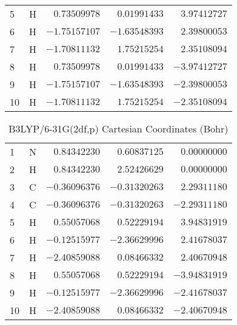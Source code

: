 \documentclass[10pt,oneside]{article}
\begin{document}
\begin{table}[h!]
\begin{multicols}{2}
\begin{tabular}{llrrr}
5  & H  & $ 0.73509978$ & $ 0.01991433$ & $ 3.97412727$ \\
6  & H  & $-1.75157107$ & $-1.63548393$ & $ 2.39800053$ \\
7  & H  & $-1.70811132$ & $ 1.75215254$ & $ 2.35108094$ \\
8  & H  & $ 0.73509978$ & $ 0.01991433$ & $-3.97412727$ \\
9  & H  & $-1.75157107$ & $-1.63548393$ & $-2.39800053$ \\
10 & H  & $-1.70811132$ & $ 1.75215254$ & $-2.35108094$ \\
\bottomrule
\end{tabular}
\end{multicols}
\end{table}

\begin{table}[h]
\centering
\caption{B3LYP/6-31G(2df,p) Cartesian Coordinates (Bohr)}
\begin{tabular}{llrrr}
\toprule
1  & N  & $ 0.84342230$ & $ 0.60837125$ & $ 0.00000000$ \\
2  & H  & $ 0.84342230$ & $ 2.52426629$ & $ 0.00000000$ \\
3  & C  & $-0.36096376$ & $-0.31320263$ & $ 2.29311180$ \\
4  & C  & $-0.36096376$ & $-0.31320263$ & $-2.29311180$ \\
5  & H  & $ 0.55057068$ & $ 0.52229194$ & $ 3.94831919$ \\
6  & H  & $-0.12515977$ & $-2.36629996$ & $ 2.41678037$ \\
7  & H  & $-2.40859088$ & $ 0.08466332$ & $ 2.40670948$ \\
8  & H  & $ 0.55057068$ & $ 0.52229194$ & $-3.94831919$ \\
9  & H  & $-0.12515977$ & $-2.36629996$ & $-2.41678037$ \\
10 & H  & $-2.40859088$ & $ 0.08466332$ & $-2.40670948$ \\
\bottomrule
\end{tabular}
\end{table}
\end{document}
